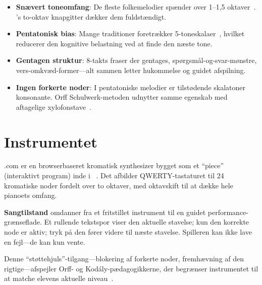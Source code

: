 \documentclass[11pt]{article}
\begin{document}
\begin{card}
\begin{itemize}
  \item \textbf{Snævert toneomfang}: De fleste folkemelodier spænder over 1--1,5 oktaver~\citep{lomax1968folk}. \np{}'s to-oktav knapgitter dækker dem fuldstændigt.
  \item \textbf{Pentatonisk bias}: Mange traditioner foretrækker 5-toneskalaer~\citep{kodaly1971folk}, hvilket reducerer den kognitive belastning ved at finde den næste tone.
  \item \textbf{Gentagen struktur}: 8-takts fraser der gentages, spørgsmål-og-svar-mønstre, vers-omkvæd-former---alt sammen letter hukommelse og guidet afspilning.
  \item \textbf{Ingen forkerte noder}: I pentatoniske melodier er tilstødende skalatoner konsonante. Orff Schulwerk-metoden udnytter samme egenskab med aftagelige xylofonstave~\citep{orff1978schulwerk}.
\end{itemize}
\end{card}

\section{Instrumentet}

\np{}.com er en browserbaseret kromatisk synthesizer bygget som et ``piece'' (interaktivt program) inde i \ac{}~\citep{scudder2026ac, scudder2026notepat}. Det afbilder QWERTY-tastaturet til 24 kromatiske noder fordelt over to oktaver, med oktavskift til at dække hele pianoets omfang.

\begin{darkcard}
\textbf{Sangtilstand} omdanner \np{} fra et fritstillet instrument til en guidet performance-grænseflade. Et rullende tekstspor viser den aktuelle stavelse; kun den korrekte node er aktiv; tryk på den fører videre til næste stavelse. Spilleren kan ikke lave en fejl---de kan kun vente.
\end{darkcard}

Denne ``støttehjuls''-tilgang---blokering af forkerte noder, fremhævning af den rigtige---afspejler Orff- og Kod\'aly-pædagogikkerne, der begrænser instrumentet til at matche elevens aktuelle niveau~\citep{kodaly1971folk, orff1978schulwerk}.

\end{document}
